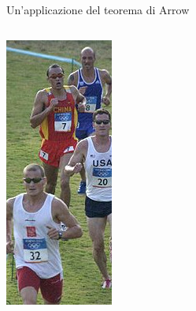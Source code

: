 \documentclass[aspectratio=64,11pt]{beamer}
\begin{document}
\begin{frame}{Un'applicazione del teorema di Arrow}
\begin{columns}
\begin{column}{.2\columnwidth}
\begin{center}
\includegraphics[width=\textwidth]{./figure/Pentathlon.jpg}
\end{center}
\end{column}
\end{columns}
\end{frame}
\end{document}
